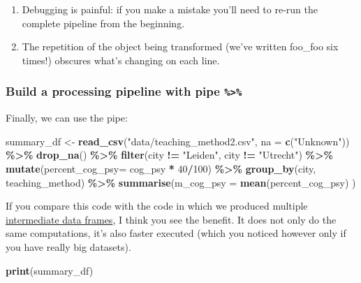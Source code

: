 \documentclass[
]{scrartcl}
\newenvironment{Shaded}{\begin{snugshade}}{\end{snugshade}}
\newcommand{\AttributeTok}[1]{\textcolor[rgb]{0.13,0.29,0.53}{#1}}
\newcommand{\DecValTok}[1]{\textcolor[rgb]{0.00,0.00,0.81}{#1}}
\newcommand{\FunctionTok}[1]{\textcolor[rgb]{0.13,0.29,0.53}{\textbf{#1}}}
\newcommand{\NormalTok}[1]{#1}
\newcommand{\OtherTok}[1]{\textcolor[rgb]{0.56,0.35,0.01}{#1}}
\newcommand{\SpecialCharTok}[1]{\textcolor[rgb]{0.81,0.36,0.00}{\textbf{#1}}}
\newcommand{\StringTok}[1]{\textcolor[rgb]{0.31,0.60,0.02}{#1}}
\providecommand{\tightlist}{%
  \setlength{\itemsep}{0pt}\setlength{\parskip}{0pt}}
\begin{document}
\begin{enumerate}
\def\labelenumi{\arabic{enumi}.}
\tightlist
\item
  Debugging is painful: if you make a mistake you'll need to re-run the complete pipeline from the beginning.
\item
  The repetition of the object being transformed (we've written foo\_foo six times!) obscures what's changing on each line.
\end{enumerate}

\subsubsection{\texorpdfstring{Build a processing pipeline with pipe \texttt{\%\textgreater{}\%}}{Build a processing pipeline with pipe \%\textgreater\%}}\label{build-a-processing-pipeline-with-pipe}

Finally, we can use the pipe:

\begin{Shaded}
\begin{Highlighting}[]
\NormalTok{summary\_df }\OtherTok{\textless{}{-}} \FunctionTok{read\_csv}\NormalTok{(}\StringTok{"data/teaching\_method2.csv"}\NormalTok{, }\AttributeTok{na =} \FunctionTok{c}\NormalTok{(}\StringTok{"Unknown"}\NormalTok{)) }\SpecialCharTok{\%\textgreater{}\%}
        \FunctionTok{drop\_na}\NormalTok{() }\SpecialCharTok{\%\textgreater{}\%}
        \FunctionTok{filter}\NormalTok{(city }\SpecialCharTok{!=} \StringTok{"Leiden"}\NormalTok{, city }\SpecialCharTok{!=} \StringTok{"Utrecht"}\NormalTok{) }\SpecialCharTok{\%\textgreater{}\%}
        \FunctionTok{mutate}\NormalTok{(}\AttributeTok{percent\_cog\_psy=}\NormalTok{ cog\_psy }\SpecialCharTok{*} \DecValTok{40}\SpecialCharTok{/}\DecValTok{100}\NormalTok{) }\SpecialCharTok{\%\textgreater{}\%}
        \FunctionTok{group\_by}\NormalTok{(city, teaching\_method) }\SpecialCharTok{\%\textgreater{}\%}
        \FunctionTok{summarise}\NormalTok{(}\AttributeTok{m\_cog\_psy =} \FunctionTok{mean}\NormalTok{(percent\_cog\_psy) )}
\end{Highlighting}
\end{Shaded}

If you compare this code with the code in which we produced multiple \hyperref[intermediatesteps]{intermediate data frames}, I think you see the benefit. It does not only do the same computations, it's also faster executed (which you noticed however only if you have really big datasets).

\begin{Shaded}
\begin{Highlighting}[]
\FunctionTok{print}\NormalTok{(summary\_df)}
\end{Highlighting}
\end{Shaded}
\end{document}
